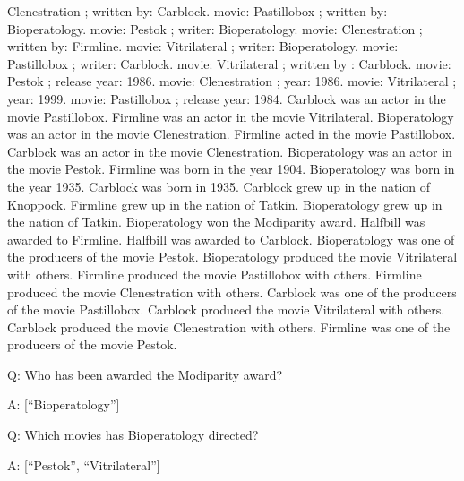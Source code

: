 \documentclass[
]{article}
\begin{document}
Clenestration ; written by: Carblock. movie: Pastillobox ; written by:
Bioperatology. movie: Pestok ; writer: Bioperatology. movie:
Clenestration ; written by: Firmline. movie: Vitrilateral ; writer:
Bioperatology. movie: Pastillobox ; writer: Carblock. movie:
Vitrilateral ; written by : Carblock. movie: Pestok ; release year:
1986. movie: Clenestration ; year: 1986. movie: Vitrilateral ; year:
1999. movie: Pastillobox ; release year: 1984. Carblock was an actor in
the movie Pastillobox. Firmline was an actor in the movie Vitrilateral.
Bioperatology was an actor in the movie Clenestration. Firmline acted in
the movie Pastillobox. Carblock was an actor in the movie Clenestration.
Bioperatology was an actor in the movie Pestok. Firmline was born in the
year 1904. Bioperatology was born in the year 1935. Carblock was born in
1935. Carblock grew up in the nation of Knoppock. Firmline grew up in
the nation of Tatkin. Bioperatology grew up in the nation of Tatkin.
Bioperatology won the Modiparity award. Halfbill was awarded to
Firmline. Halfbill was awarded to Carblock. Bioperatology was one of the
producers of the movie Pestok. Bioperatology produced the movie
Vitrilateral with others. Firmline produced the movie Pastillobox with
others. Firmline produced the movie Clenestration with others. Carblock
was one of the producers of the movie Pastillobox. Carblock produced the
movie Vitrilateral with others. Carblock produced the movie
Clenestration with others. Firmline was one of the producers of the
movie Pestok.

Q: Who has been awarded the Modiparity award?

A: {[}``Bioperatology''{]}

Q: Which movies has Bioperatology directed?

A: {[}``Pestok'', ``Vitrilateral''{]}
\end{document}
